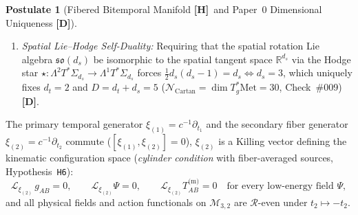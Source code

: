 \documentclass[11pt,a4paper]{article}
\newcommand{\catD}{\textbf{\textcolor{blue!75!black}{[D]}}}
\newcommand{\catH}{\textbf{\textcolor{orange!85!black}{[H]}}}
\theoremstyle{definition}
\newtheorem{postulate}[theorem]{Postulate}
\theoremstyle{remark}
\begin{document}
\begin{postulate}[Fibered Bitemporal Manifold \catH\ and Paper~0 Dimensional Uniqueness \catD]
\begin{enumerate}
  \item[\textnormal{(b)}] \emph{Spatial Lie--Hodge Self-Duality:} Requiring that the spatial rotation Lie algebra $\mathfrak{so}(d_s)$ be isomorphic to the spatial tangent space $\mathbb{R}^{d_s}$ via the Hodge star $\star: \Lambda^2 T^*\Sigma_{d_s} \to \Lambda^1 T^*\Sigma_{d_s}$ forces $\frac{1}{2}d_s(d_s - 1) = d_s \Longleftrightarrow d_s = 3$, which uniquely fixes $d_t = 2$ and $D = d_t + d_s = 5$ ($\mathcal{N}_{\text{Cartan}} = \dim T^*_g\text{Met} = 30$, Check~\#009) \catD.
\end{enumerate}
The primary temporal generator $\xi_{(1)} = c^{-1}\partial_{t_1}$ and the secondary fiber generator $\xi_{(2)} = c^{-1}\partial_{t_2}$ commute ($[\xi_{(1)}, \xi_{(2)}] = 0$), $\xi_{(2)}$ is a Killing vector defining the kinematic configuration space (\emph{cylinder condition} with fiber-averaged sources, Hypothesis~\texttt{H6}):
\begin{equation}
  \mathcal{L}_{\xi_{(2)}}\,g_{AB} = 0, \qquad \mathcal{L}_{\xi_{(2)}}\Psi = 0, \qquad \mathcal{L}_{\xi_{(2)}}T_{AB}^{\text{(m)}} = 0
  \quad\text{for every low-energy field }\Psi,
  \label{eq:cylinder}
\end{equation}
and all physical fields and action functionals on $\mathcal{M}_{3,2}$ are $\mathcal{R}$-even under $t_2 \mapsto -t_2$.
\end{postulate}
\end{document}
